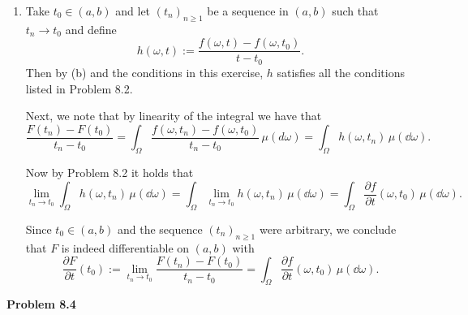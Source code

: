 \begin{enumerate}[label={(\alph*)}]
	Taking the modulus on both sides, we obtain
	\[
		\left|\frac{f(\omega,t)-f(\omega,t_0)}{t-t_0}\right| \le |(\partial f/\partial t)(\omega,\tau)|\le g(\omega)\qquad\text{for all $\omega\in\Omega$}.
	\]
	\item {}
	
	Take $t_0 \in (a,b)$ and let $(t_n)_{n \ge 1}$ be a sequence in $(a,b)$ such that $t_n \to t_0$ and define
	\[
		h(\omega, t) := \frac{f(\omega, t) - f(\omega, t_0)}{t - t_0}.
	\] 
	Then by (b) and the conditions in this exercise, $h$ satisfies all the conditions listed in Problem 8.2.
	
	Next, we note that by linearity of the integral we have that
	\[
		\frac{F(t_n) - F(t_0)}{t_n - t_0} = \int_\Omega \frac{f(\omega, t_n) - f(\omega, t_0)}{t_n - t_0} \, \mu(d \omega)
		= \int_\Omega h(\omega, t_n) \, \mu(\dd \omega).
	\]
	
	Now by Problem 8.2 it holds that 
	\[
		\lim_{t_n \to t_0} \int_\Omega h(\omega, t_n) \, \mu(\dd \omega) 
		= \int_\Omega \lim_{t_n \to t_0} h(\omega, t_n) \, \mu(\dd \omega) = \int_\Omega \frac{\partial f}{\partial t}(\omega, t_0) \, \mu(\dd \omega).
	\]
	
	Since $t_0 \in(a,b)$ and the sequence $(t_n)_{n\ge 1}$ were arbitrary, we conclude that $F$ is indeed differentiable on $(a,b)$ with 
	\[
		\frac{\partial F}{\partial t}(t_0) := \lim_{t_n \to t_0} \frac{F(t_n) - F(t_0)}{t_n - t_0} 
		= \int_\Omega \frac{\partial f}{\partial t}(\omega,t_0)\,\mu(\dd\omega).
	\]
\end{enumerate}

\bigskip

\textbf{Problem 8.4}

